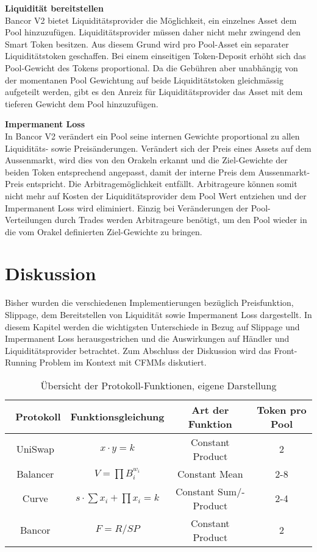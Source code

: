 \documentclass[12pt,a4paper,titlepage,oneside,english]{article}
\begin{document}
\textbf{Liquidität bereitstellen}\\
Bancor V2 bietet Liquiditätsprovider die Möglichkeit, ein einzelnes Asset dem Pool hinzuzufügen. Liquiditätsprovider müssen daher nicht mehr zwingend den Smart Token besitzen. Aus diesem Grund wird pro Pool-Asset ein separater Liquiditätstoken geschaffen. Bei einem einseitigen Token-Deposit erhöht sich das Pool-Gewicht des Tokens proportional. Da die Gebühren aber unabhängig von der momentanen Pool Gewichtung auf beide Liquiditätstoken gleichmässig aufgeteilt werden, gibt es den Anreiz für Liquiditätsprovider das Asset mit dem tieferen Gewicht dem Pool hinzuzufügen. \citep{Shachav2020}

\textbf{Impermanent Loss}\\
In Bancor V2 verändert ein Pool seine internen Gewichte proportional zu allen Liquiditäts- sowie Preisänderungen. Verändert sich der Preis eines Assets auf dem Aussenmarkt, wird dies von den Orakeln erkannt und die Ziel-Gewichte der beiden Token entsprechend angepasst, damit der interne Preis dem Aussenmarkt-Preis entspricht. Die Arbitragemöglichkeit entfällt. Arbitrageure können somit nicht mehr auf Kosten der Liquiditätsprovider dem Pool Wert entziehen und der Impermanent Loss wird eliminiert. Einzig bei Veränderungen der Pool-Verteilungen durch Trades werden Arbitrageure benötigt, um den Pool wieder in die vom Orakel definierten Ziel-Gewichte zu bringen. \citep{Chainlink2020} 

\section{Diskussion}
Bisher wurden die verschiedenen Implementierungen bezüglich Preisfunktion, Slippage, dem Bereitstellen von Liquidität sowie Impermanent Loss dargestellt. In diesem Kapitel werden die wichtigsten Unterschiede in Bezug auf Slippage und Impermanent Loss herausgestrichen und die Auswirkungen auf Händler und Liquiditätsprovider betrachtet. %
Zum Abschluss der Diskussion wird das Front-Running Problem im Kontext mit CFMMs diskutiert.\\

\begin{table}[h!]
\renewcommand{\arraystretch}{1.5}
  \center
  \begin{tabular}{cccc}
    \hline\hline\
    Protokoll & Funktionsgleichung & Art der Funktion & Token pro Pool \\ \hline
    UniSwap & $ x \cdot y=k$ & Constant Product &  2  \\    
    Balancer & $V=\prod B_{i}^{w_{i}}$ & Constant Mean  & 2-8 \\ 
    Curve & $s \cdot \sum x_{i}+\prod x_{i} = k $ & Constant Sum/-Product & 2-4  \\
    Bancor & $F=R/SP$ & Constant Product & 2 \\
    \hline\hline
  \end{tabular}
  \caption{Übersicht der Protokoll-Funktionen, eigene Darstellung}
  \label{tbl:Protokolle}
\end{table}
\end{document}
